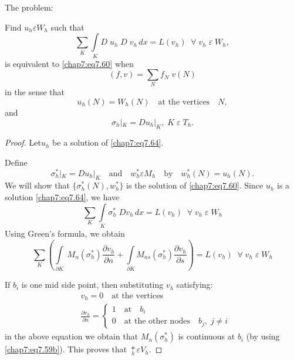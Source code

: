 \begin{THM}\label{chap7:THM13}
The problem:

Find $u_h\varepsilon W_h$ such that 
\begin{equation}\label{chap7:eq7.64}
\sum\limits_K\int\limits_K D\;u_h \;D\;v_h\,dx=L(v_h)\;\; \forall \;v_h
\;\varepsilon \;W_h,
\end{equation}
is equivalent to \eqref{chap7:eq7.60} when 
$$
(f,v)=\sum\limits_N f_N\;v(N)
$$
in the sense that 
$$
u_h(N)=W_h(N)\quad\text{at the vertices}\quad N,
$$
and 
$$
\sigma_h|_K=Du_h|_K,\;K\;\varepsilon \;T_h.
$$
\end{THM}
\begin{proof}
Let\pageoriginale $u_h$ be a solution of \eqref{chap7:eq7.64}.

Define
$$
\sigma_h^*|_K=Du_h|_K\quad\text{and}\quad w_h^*\varepsilon M_h\quad
\text{by}\quad w_h^*(N)=u_h(N).
$$
We will show that $\{\sigma_h^*(N),w_h^*\}$ is the solution of
\eqref{chap7:eq7.60}. Since $u_h$ is a solution \eqref{chap7:eq7.64},
we have 
\begin{equation}\label{chap7:eq7.65}
\sum\limits_K\int\limits_K\sigma_h^*\;Dv_h\,dx=L(v_h)\; \; \forall \;v_h\;
\varepsilon \;W_h
\end{equation}
Using Green's formula, we obtain 
\begin{equation}\label{chap7:eq7.66}
\sum\limits_K\left(\int\limits_{\partial K}\;M_n(\sigma_h^*)
\frac{\partial v_h}{\partial n}+\int\limits_{\partial K}M_{ns}
(\sigma_h^*)\frac{\partial v_h}{\partial s}\right)=L(v_h)\; \; \forall
\;v_h \;\varepsilon \;W_h
\end{equation}

If $b_i$ is one mid side point, then substituting $v_h$ satisfying:
\begin{align*}
&v_h=0\quad\text{at the vertices}\\
&\frac{\partial v_h}{\partial n}=
\begin{cases}
1\quad\text{at}\quad b_i\\
0\quad\text{at the other nodes}\quad b_j,\;j\neq i
\end{cases}
\end{align*}
in the above equation we obtain that $M_n(\sigma_h^*)$ is continuous
at $b_i$ (by using \ref{chap7:eq7.59b}). This proves that
$\underset{h}{*}\varepsilon V_h$.


\end{proof}
